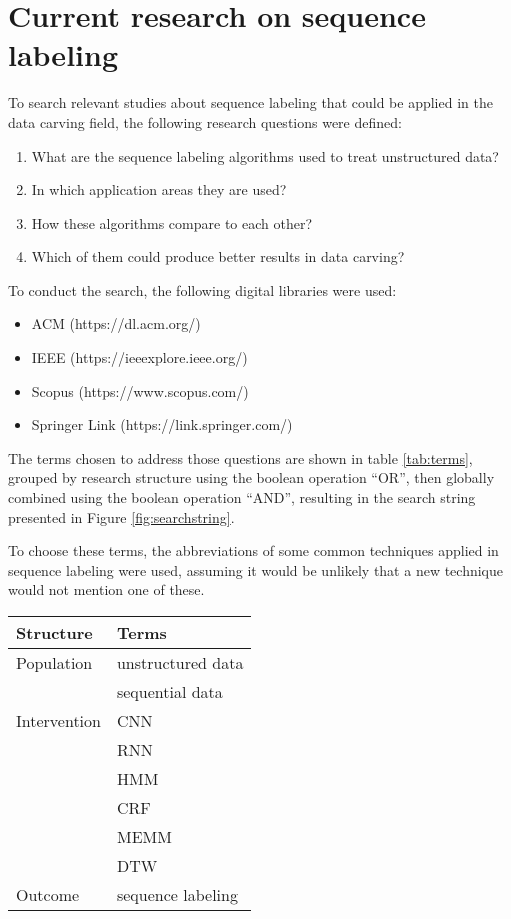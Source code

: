 \section{Current research on sequence labeling}
To search relevant studies about sequence labeling that could be applied in the data carving field, the following research questions were defined:

\begin{enumerate}
\item   What are the sequence labeling algorithms used to treat unstructured data?
\item   In which application areas they are used?
\item   How these algorithms compare to each other?
\item   Which of them could produce better results in data carving?
\end{enumerate}


To conduct the search, the following digital libraries were used: 
\begin{itemize}
\item{ACM} (https://dl.acm.org/)
\item IEEE (https://ieeexplore.ieee.org/)
\item Scopus (https://www.scopus.com/) 
\item Springer Link (https://link.springer.com/)
\end{itemize}

The terms chosen to address those questions are shown in table \ref{tab:terms}, grouped by research structure using the boolean operation “OR”, then globally combined using the boolean operation “AND”, resulting in the search string presented in  Figure \ref{fig:searchstring}.

To choose these terms, the abbreviations of some common techniques applied in sequence labeling were used, assuming it would be unlikely that a new technique would not mention one of these.

\begin{table*}[!ht]
    \centering
    \begin{tabular}{ l  l  }
      Structure 	& Terms 		 \\
      \hline\hline
      Population 	& unstructured data \\   
                    & sequential data \\
      \hline
      Intervention 	& CNN \\
                    & RNN \\
                    & HMM \\
                    & CRF \\
                    & MEMM \\
                    & DTW \\
      \hline
      Outcome 		& sequence labeling \\
      \hline
    \end{tabular}
    \caption{Terms used}
    \label{tab:terms}
\end{table*}

